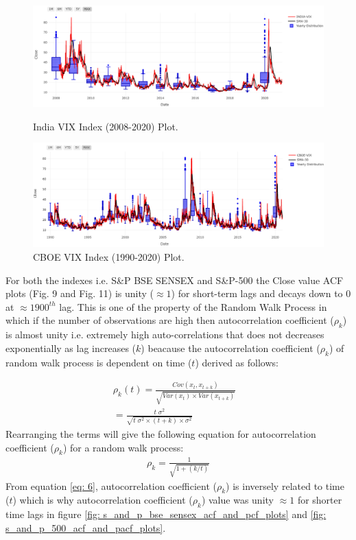 \documentclass[conference]{IEEEtran}
\begin{document}
\begin{figure}[htbp]
	\centering
	\includegraphics[width = 0.52 \textwidth]{images/INDIA-VIX (2008-2020).png}
	\caption{India VIX Index (2008-2020) Plot.}
	\label{fig:india_vix_index}
	\includegraphics[width = 0.52 \textwidth]{images/CBOE-VIX.png}
	\caption{CBOE VIX Index (1990-2020) Plot.}
	\label{fig:cboe_vix_index}
\end{figure}

For both the indexes i.e. S\&P BSE SENSEX and S\&P-500 the Close value ACF plots (Fig. 9 and Fig. 11) is unity ($\approx 1$) for short-term lags and decays down to $0$ at $\approx 1900^{th}$ lag. This is one of the property of the Random Walk Process in which if the number of observations are high then autocorrelation coefficient ($\rho_{k}$) is almost unity i.e. extremely high auto-correlations that does not decreases exponentially as lag increases ($k$) beacause the autocorrelation coefficient ($\rho_{k}$) of random walk process is dependent on time ($t$) derived as follows:

\begin{align}
\rho_{k}(t) = \frac{Cov(x_{t}, x_{t+k})}{\sqrt{Var(x_{t}) \times Var(x_{t + k})}} \label{eq: 4}& \\ = \frac{t\;\sigma^{2}}{\sqrt{t\;\sigma^{2}\times(t + k)\times \sigma^{2}}} \label{eq: 5}
\end{align}
Rearranging the terms will give the following equation for autocorrelation coefficient ($\rho_{k}$) for a random walk process:
\begin{align}
\rho_{k} = \frac{1}{\sqrt{1 + (k / t)}} \label{eq: 6}
\end{align}
From equation \eqref{eq: 6}, autocorrelation coefficient ($\rho_{k}$) is inversely related to time ($t$) which is why autocorrelation coefficient ($\rho_{k}$) value was unity $\approx 1$ for shorter time lags in figure \ref{fig: s_and_p_bse_sensex_acf_and_pcf_plots} and \ref{fig: s_and_p_500_acf_and_pacf_plots}.
\end{document}
